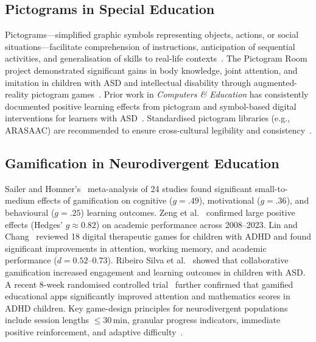 \documentclass[preprint,12pt]{elsarticle}
\begin{document}
        \subsection{Pictograms in Special Education}
            Pictograms---simplified graphic symbols representing objects, actions, or social situations---facilitate comprehension of instructions, anticipation of sequential activities, and generalisation of skills to real-life contexts~\cite{Johnston2016,Perez-Fuster2025}. The Pictogram Room project demonstrated significant gains in body knowledge, joint attention, and imitation in children with ASD and intellectual disability through augmented-reality pictogram games~\cite{Perez-Fuster2025}. Prior work in \textit{Computers \& Education} has consistently documented positive learning effects from pictogram and symbol-based digital interventions for learners with ASD~\cite{Grossard2017,Lorenzo2016,Cinquin2019}. Standardised pictogram libraries (e.g., ARASAAC) are recommended to ensure cross-cultural legibility and consistency~\cite{Haro2024}.
        
        \subsection{Gamification in Neurodivergent Education}
            Sailer and Homner's~\cite{Sailer2020} meta-analysis of 24 studies found significant small-to-medium effects of gamification on cognitive ($g = .49$), motivational ($g = .36$), and behavioural ($g = .25$) learning outcomes. Zeng et al.~\cite{Zeng2024} confirmed large positive effects (Hedges' $g \approx 0.82$) on academic performance across 2008--2023. Lin and Chang~\cite{Lin2025} reviewed 18 digital therapeutic games for children with ADHD and found significant improvements in attention, working memory, and academic performance ($d = 0.52$--$0.73$). Ribeiro Silva et al.~\cite{Ribeiro2024} showed that collaborative gamification increased engagement and learning outcomes in children with ASD. A recent 8-week randomised controlled trial~\cite{Dai2025} further confirmed that gamified educational apps significantly improved attention and mathematics scores in ADHD children. Key game-design principles for neurodivergent populations include session lengths $\leq 30$\,min, granular progress indicators, immediate positive reinforcement, and adaptive difficulty~\cite{Alqithami2021,Harrison2020}.
        
\end{document}
